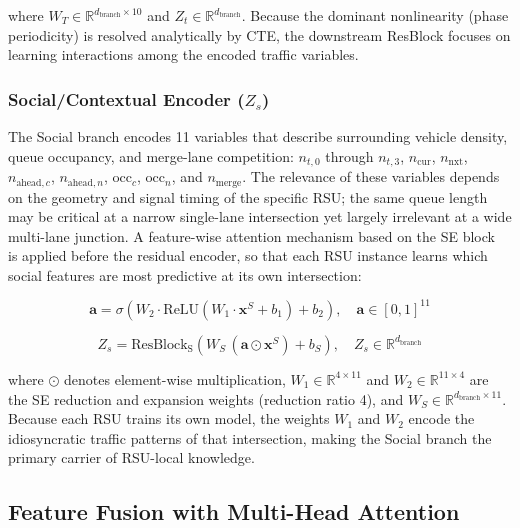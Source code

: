 \documentclass[journal]{IEEEtran}
\begin{document}
where $W_T \in \mathbb{R}^{d_\text{branch} \times 10}$ and $Z_t \in \mathbb{R}^{d_\text{branch}}$.
Because the dominant nonlinearity (phase periodicity) is resolved analytically by CTE, the downstream ResBlock focuses on learning interactions among the encoded traffic variables.

\subsubsection{Social/Contextual Encoder ($Z_s$)}

The Social branch encodes 11 variables that describe surrounding vehicle density, queue occupancy, and merge-lane competition:
$n_{t,0}$ through $n_{t,3}$, $n_\text{cur}$, $n_\text{nxt}$, $n_{\text{ahead},c}$, $n_{\text{ahead},n}$, $\text{occ}_c$, $\text{occ}_n$, and $n_\text{merge}$.
The relevance of these variables depends on the geometry and signal timing of the specific RSU; the same queue length may be critical at a narrow single-lane intersection yet largely irrelevant at a wide multi-lane junction.
A feature-wise attention mechanism based on the SE block~\cite{Hu2018SENet} is applied before the residual encoder, so that each RSU instance learns which social features are most predictive at its own intersection:

\begin{equation}
\mathbf{a} = \sigma\!\left(W_2 \cdot \text{ReLU}(W_1 \cdot \mathbf{x}^S + b_1) + b_2\right), \quad \mathbf{a} \in [0,1]^{11}
\label{eq:se_attn}
\end{equation}

\begin{equation}
Z_s = \text{ResBlock}_\text{S}\!\left(W_S\,(\mathbf{a} \odot \mathbf{x}^S) + b_S\right), \quad Z_s \in \mathbb{R}^{d_\text{branch}}
\label{eq:zs}
\end{equation}

where $\odot$ denotes element-wise multiplication, $W_1 \in \mathbb{R}^{4 \times 11}$ and $W_2 \in \mathbb{R}^{11 \times 4}$ are the SE reduction and expansion weights (reduction ratio 4), and $W_S \in \mathbb{R}^{d_\text{branch} \times 11}$.
Because each RSU trains its own model, the weights $W_1$ and $W_2$ encode the idiosyncratic traffic patterns of that intersection, making the Social branch the primary carrier of RSU-local knowledge.

\subsection{Feature Fusion with Multi-Head Attention}
\label{sec.prop.C}
\end{document}
